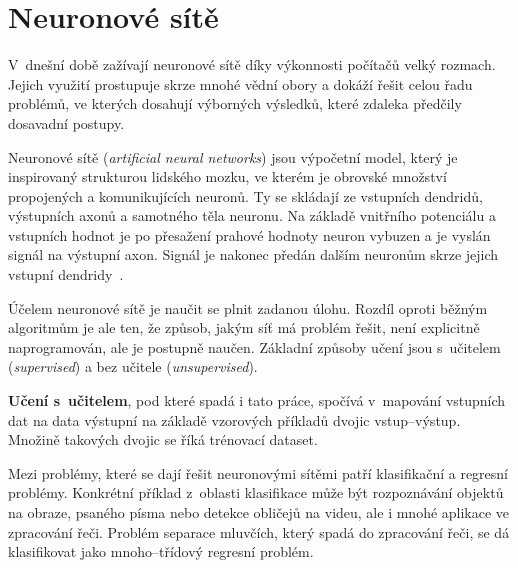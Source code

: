 



\chapter{Neuronové sítě}
\label{neuronovky}
V~dnešní době zažívají neuronové sítě díky výkonnosti počítačů velký rozmach. Jejich využití prostupuje skrze mnohé vědní obory a dokáží řešit celou řadu problémů, ve kterých dosahují výborných výsledků, které zdaleka předčily dosavadní postupy. 

Neuronové sítě (\textit{artificial neural networks}) jsou výpočetní model, který je inspirovaný strukturou lidského mozku, ve kterém je obrovské množství propojených a komunikujících neuronů. Ty se skládají ze vstupních dendridů, výstupních axonů a samotného těla neuronu. Na základě vnitřního potenciálu a vstupních hodnot je po přesažení prahové hodnoty neuron vybuzen a je vyslán signál na výstupní axon. Signál je nakonec předán dalším neuronům skrze jejich vstupní dendridy~\cite{mitdeeplearning_small}.

Účelem neuronové sítě je naučit se plnit zadanou úlohu. Rozdíl oproti běžným algoritmům je ale ten, že způsob, jakým síť má problém řešit, není explicitně naprogramován, ale je postupně naučen. Základní způsoby učení jsou s~učitelem (\textit{supervised}) a bez učitele (\textit{unsupervised}). 

\textbf{Učení s~učitelem}, pod které spadá i tato práce, spočívá v~mapování vstupních dat na data výstupní na základě vzorových příkladů dvojic vstup--výstup. Množině takových dvojic se říká trénovací dataset.

Mezi problémy, které se dají řešit neuronovými sítěmi patří klasifikační a regresní problémy. Konkrétní příklad z~oblasti klasifikace může být rozpoznávání objektů na obraze, psaného písma nebo detekce obličejů na videu, ale i mnohé aplikace ve zpracování řeči. Problém separace mluvčích, který spadá do zpracování řeči, se dá klasifikovat jako mnoho--třídový regresní problém.


